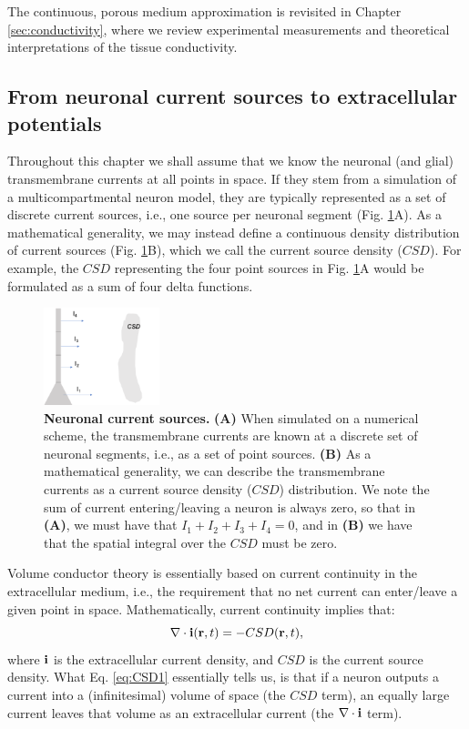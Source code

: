 The continuous, porous medium approximation is revisited in Chapter \ref{sec:conductivity}, where we review experimental measurements and theoretical interpretations of the tissue conductivity.


\subsection{From neuronal current sources to extracellular potentials}
\label{sec:continuous}
Throughout this chapter we shall assume that we know the neuronal (and glial) transmembrane currents at all points in space. If they stem from a simulation of a multicompartmental neuron model, they are typically represented as a set of discrete current sources, i.e., one source per neuronal segment (Fig. \ref{fig:CSD}A). As a mathematical generality, we may instead define a continuous density distribution of current sources (Fig. \ref{fig:CSD}B), which we call the current source density ($CSD$). For example, the $CSD$ representing the four point sources in Fig. \ref{fig:CSD}A would be formulated as a sum of four delta functions. 

\begin{figure}[!ht]
\begin{center}
\includegraphics[width=0.3\textwidth]{Figures/CSD.png}
\end{center}
\caption{\textbf{Neuronal current sources.}  {\bf (A)} When simulated on a numerical scheme, the transmembrane currents are known at a discrete set of neuronal segments, i.e., as a set of point sources.  {\bf (B)} As a mathematical generality, we can describe the transmembrane currents as a current source density ($CSD$) distribution. We note the sum of current entering/leaving a neuron is always zero, so that in {\bf (A)}, we must have that $I_1 + I_2 + I_3 + I_4 = 0$, and in {\bf (B)} we have that the spatial integral over the $CSD$ must be zero.
}
\label{fig:CSD}
\end{figure}
Volume conductor theory is essentially based on current continuity in the extracellular medium, i.e., the requirement that no net current can enter/leave a given point in space. Mathematically, current continuity implies that:
\begin{equation}
\nabla \cdot {\bf i}({\bf r}, t) = - CSD({\bf r}, t),
\label{eq:CSD1}
\end{equation}
where ${\bf i}$ is the extracellular current density, and $CSD$ is the current source density. What Eq. \ref{eq:CSD1} essentially tells us, is that if a neuron outputs a current into a (infinitesimal) volume of space (the $CSD$ term), an equally large current leaves that volume as an extracellular current (the $\nabla \cdot {\bf i}$ term).

